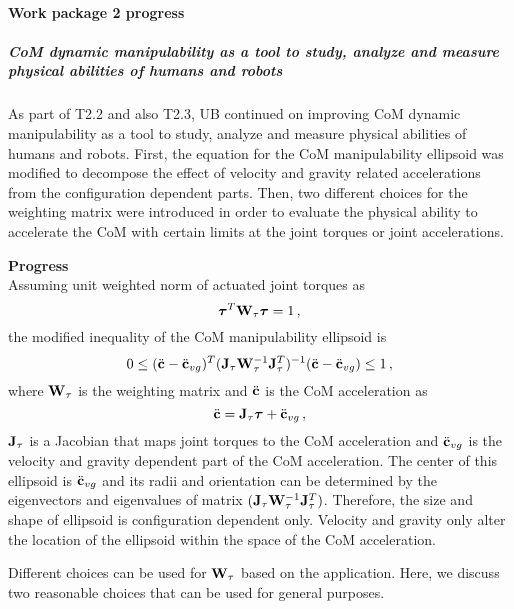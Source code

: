 \paragraph{Work package 2 progress}


\subparagraph*{CoM dynamic manipulability as a tool to study, analyze and measure physical abilities of humans and robots}
As part of T2.2 and also T2.3, UB continued on improving CoM dynamic manipulability as a tool to study, analyze and measure physical abilities of humans and robots.  First, the equation for the CoM manipulability ellipsoid was modified to decompose the effect of velocity and gravity related accelerations from the configuration dependent parts.  Then, two different
choices for the weighting matrix were introduced in order to evaluate the physical ability to accelerate the CoM with certain limits at the joint torques or joint accelerations.
\bigskip

\textbf{Progress}\\
Assuming unit weighted norm of actuated joint torques as
%
\begin{equation}
\boldsymbol{\tau}^T \mathbf{W}_\tau \boldsymbol{\tau} = 1 \, ,
\label{tauWtau=1}
\end{equation}    
%
the modified inequality of the CoM manipulability ellipsoid is
%
\begin{equation}
0 \le (\ddot{\mathbf{c}} - \ddot{\mathbf{c}}_{vg})^T (\mathbf{J}_\tau \mathbf{W}_\tau^{-1}
\mathbf{J}_\tau^T)^{-1} (\ddot{\mathbf{c}} - \ddot{\mathbf{c}}_{vg}) \le 1 \, ,
\label{torqueellipse}
\end{equation}
%
where $\mathbf{W}_\tau$ is the weighting matrix and $\ddot{\mathbf{c}}$ is the CoM
acceleration as
%
\begin{equation}
\ddot{\mathbf{c}} = \mathbf{J}_\tau \boldsymbol{\tau} + \ddot{\mathbf{c}}_{vg} \, ,
\label{cdd}
\end{equation}
%
$\mathbf{J}_\tau$ is a Jacobian that maps joint torques to the CoM acceleration and
$\ddot{\mathbf{c}}_{vg}$ is the velocity and gravity dependent part of the CoM
acceleration.  The center of this ellipsoid is $\ddot{\mathbf{c}}_{vg}$ and its radii
and orientation can be determined by the eigenvectors and eigenvalues of
matrix $(\mathbf{J}_\tau \mathbf{W}_\tau^{-1} \mathbf{J}_\tau^T)$.  Therefore, the size and shape
of ellipsoid is configuration dependent only.  Velocity and gravity only alter
the location of the ellipsoid within the space of the CoM acceleration.

Different choices can be used for $\mathbf{W}_\tau$ based on the application.  Here,
we discuss two reasonable choices that can be used for general purposes.\\

